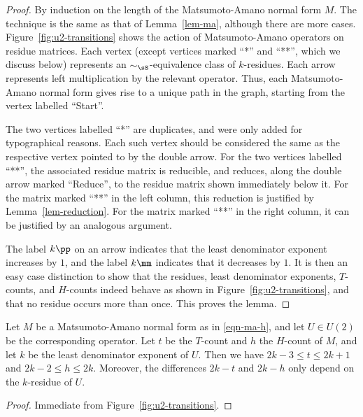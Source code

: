 \documentclass{article}
\begin{document}
\begin{proof}
  By induction on the length of the Matsumoto-Amano normal form $M$.
  The technique is the same as that of Lemma~\ref{lem-ma}, although
  there are more cases.  Figure~\ref{fig:u2-transitions} shows the
  action of Matsumoto-Amano operators on residue matrices. Each vertex
  (except vertices marked ``*'' and ``**'', which we discuss below)
  represents an $\sim_{\sS}$-equivalence class of $k$-residues. Each
  arrow represents left multiplication by the relevant operator. Thus,
  each Matsumoto-Amano normal form gives rise to a unique path in the
  graph, starting from the vertex labelled ``Start''.

  The two vertices labelled ``*'' are duplicates, and were only added
  for typographical reasons. Each such vertex should be considered the
  same as the respective vertex pointed to by the double arrow.  For
  the two vertices labelled ``**'', the associated residue matrix is 
  reducible, and reduces,
  along the double arrow marked ``Reduce'', to the residue matrix
  shown immediately below it. For the matrix marked ``**'' in the left
  column, this reduction is justified by
  Lemma~\ref{lem-reduction}. For the matrix marked ``**'' in the right
  column, it can be justified by an analogous argument.

  The label $k\pp$ on an arrow indicates that the least denominator
  exponent increases by $1$, and the label $k\mm$ indicates that it
  decreases by $1$. It is then an easy case distinction to show that
  the residues, least denominator exponents, $T$-counts, and
  $H$-counts indeed behave as shown in
  Figure~\ref{fig:u2-transitions}, and that no residue occurs more
  than once. This proves the lemma.
\end{proof}

\begin{corollary}
  Let $M$ be a Matsumoto-Amano normal form as in {\eqref{eqn-ma-h}},
  and let $U\in U(2)$ be the corresponding operator. Let $t$ be the
  $T$-count and $h$ the $H$-count of $M$, and let $k$ be the least
  denominator exponent of $U$. Then we have $2k-3\leq t\leq 2k+1$ and
  $2k-2\leq h\leq 2k$. Moreover, the differences $2k-t$ and $2k-h$
  only depend on the $k$-residue of $U$.
\end{corollary}

\begin{proof}
  Immediate from Figure~\ref{fig:u2-transitions}.
\end{proof}


\end{document}

